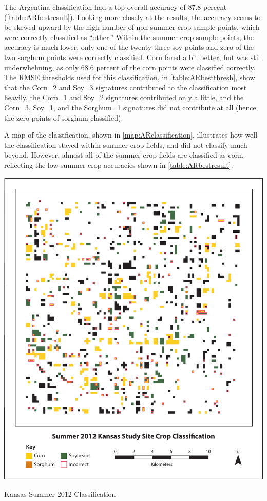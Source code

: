 The Argentina classification had a top overall accuracy of 87.8 percent (\autoref{table:ARbestresult}). Looking more closely at the results, the accuracy seems to be skewed upward by the high number of non-summer-crop sample points, which were correctly classified as ``other.'' Within the summer crop sample points, the accuracy is much lower; only one of the twenty three soy points and zero of the two sorghum points were correctly classified. Corn fared a bit better, but was still underwhelming, as only 68.6 percent of the corn points were classified correctly. The RMSE thresholds used for this classification, in \autoref{table:ARbestthresh}, show that the Corn\_2 and Soy\_3 signatures contributed to the classification most heavily, the Corn\_1 and Soy\_2 signatures contributed only a little, and the Corn\_3, Soy\_1, and the Sorghum\_1 signatures did not contribute at all (hence the zero points of sorghum classified).

A map of the classification, shown in \autoref{map:ARclassification}, illustrates how well the classification stayed within summer crop fields, and did not classify much beyond. However, almost all of the summer crop fields are classified as corn, reflecting the low summer crop accuracies shown in \autoref{table:ARbestresult}.

\begin{ssfigure}
  \centering
  \includegraphics[width=\textwidth]{Graphics/KSclass.pdf}
  \caption{Kansas Summer 2012 Classification}
  \label{map:KSclassification}
\end{ssfigure}

